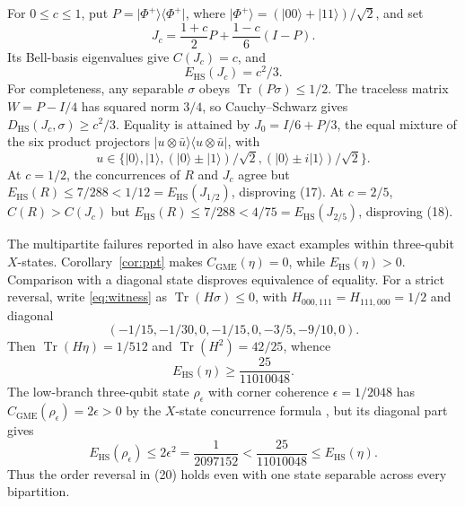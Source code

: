 \documentclass[11pt]{article}
\newcommand{\ket}[1]{\lvert #1\rangle}
\newcommand{\bra}[1]{\langle #1\rvert}
\newcommand{\proj}[1]{\ket{#1}\!\bra{#1}}
\newcommand{\Tr}{\operatorname{Tr}}
\newcommand{\E}{E_{\mathrm{HS}}}
\newcommand{\D}{D_{\mathrm{HS}}}
\begin{document}
For $0\le c\le1$, put $P=\proj{\Phi^+}$, where
$\ket{\Phi^+}=(\ket{00}+\ket{11})/\sqrt2$, and set
\[
 J_c=\frac{1+c}{2}P+\frac{1-c}{6}(I-P).
\]
Its Bell-basis eigenvalues give $C(J_c)=c$, and
\begin{equation}\label{eq:isotropic}
 \E(J_c)=c^2/3.
\end{equation}
For completeness, any separable $\sigma$ obeys $\Tr(P\sigma)\le1/2$.
The traceless matrix $W=P-I/4$ has squared norm $3/4$, so Cauchy--Schwarz
gives $\D(J_c,\sigma)\ge c^2/3$.
Equality is attained by $J_0=I/6+P/3$, the equal mixture of the six product
projectors $\proj{u\otimes\bar u}$, with
\[
 u\in\{\ket0,\ket1,(\ket0\pm\ket1)/\sqrt2,
                       (\ket0\pm i\ket1)/\sqrt2\}.
\]
At $c=1/2$, the concurrences of $R$ and $J_c$ agree but
$\E(R)\le7/288<1/12=\E(J_{1/2})$, disproving (17).
At $c=2/5$, $C(R)>C(J_c)$ but
$\E(R)\le7/288<4/75=\E(J_{2/5})$, disproving (18).

The multipartite failures reported in \cite[Eqs.~(19)--(20)]{CAW} also
have exact examples within three-qubit $X$-states. Corollary~\ref{cor:ppt}
makes $C_{\mathrm{GME}}(\eta)=0$, while $\E(\eta)>0$.
Comparison with a diagonal state disproves equivalence of equality.
For a strict reversal, write \eqref{eq:witness} as
$\Tr(H\sigma)\le0$, with $H_{000,111}=H_{111,000}=1/2$ and diagonal
\[
 (-1/15,-1/30,0,-1/15,0,-3/5,-9/10,0).
\]
Then $\Tr(H\eta)=1/512$ and $\Tr(H^2)=42/25$, whence
\[
 \E(\eta)\ge\frac{25}{11010048}.
\]
The low-branch three-qubit state $\rho_{\epsilon}$ with corner coherence
$\epsilon=1/2048$ has
$C_{\mathrm{GME}}(\rho_{\epsilon})=2\epsilon>0$
by the $X$-state concurrence formula \cite{Rafsanjani}, but its diagonal
part gives
\[
 \E(\rho_{\epsilon})\le2\epsilon^2=\frac1{2097152}
 <\frac{25}{11010048}\le\E(\eta).
\]
Thus the order reversal in (20) holds even with one state separable across
every bipartition.
\end{document}
